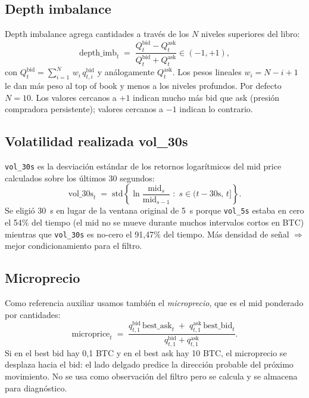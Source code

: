 \documentclass[journal,onecolumn,11pt]{IEEEtran}
\begin{document}
\subsection{Depth imbalance}\label{ssec:dimbalance}

Depth imbalance agrega cantidades a través de los $N$ niveles
superiores del libro:
\begin{equation}
\text{depth\_imb}_t \;=\; \frac{Q^{\text{bid}}_t - Q^{\text{ask}}_t}
                                    {Q^{\text{bid}}_t + Q^{\text{ask}}_t}
                                    \in (-1, +1),
\label{eq:depthimb}
\end{equation}
con
$Q^{\text{bid}}_t = \sum_{i=1}^{N}\,w_i \, q^{\text{bid}}_{t,i}$ y
análogamente $Q^{\text{ask}}_t$. Los pesos lineales $w_i = N\!-\!i\!+\!1$
le dan más peso al top of book y menos a los niveles profundos.
Por defecto $N=10$. Los valores cercanos a $+1$ indican mucho más bid
que ask (presión compradora persistente); valores cercanos a $-1$
indican lo contrario.

\subsection{Volatilidad realizada vol\_30s}\label{ssec:vol30s}

\texttt{vol\_30s} es la desviación estándar de los retornos
logarítmicos del mid price calculados sobre los últimos 30 segundos:
\begin{equation}
\text{vol\_30s}_t \;=\; \mathrm{std}\!\left\{
\ln \frac{\text{mid}_s}{\text{mid}_{s-1}}
\;:\; s\in (t-30\text{s},\,t]
\right\}.
\label{eq:vol30s}
\end{equation}
Se eligió 30~s en lugar de la ventana original de 5~s porque
\texttt{vol\_5s} estaba en cero el 54\% del tiempo (el mid no se mueve
durante muchos intervalos cortos en BTC) mientras que
\texttt{vol\_30s} es no-cero el 91{,}47\% del tiempo. Más densidad de
señal $\Rightarrow$ mejor condicionamiento para el filtro.

\subsection{Microprecio}

Como referencia auxiliar usamos también el \emph{microprecio}, que
es el mid ponderado por cantidades:
\begin{equation}
\text{microprice}_t \;=\;
\frac{q^{\text{bid}}_{t,1}\,\text{best\_ask}_t \;+\;
      q^{\text{ask}}_{t,1}\,\text{best\_bid}_t}
     {q^{\text{bid}}_{t,1} + q^{\text{ask}}_{t,1}}.
\label{eq:microprice}
\end{equation}
Si en el best bid hay 0{,}1 BTC y en el best ask hay 10 BTC, el
microprecio se desplaza hacia el bid: el lado delgado predice la
dirección probable del próximo movimiento. No se usa como observación
del filtro pero se calcula y se almacena para diagnóstico.
\end{document}
